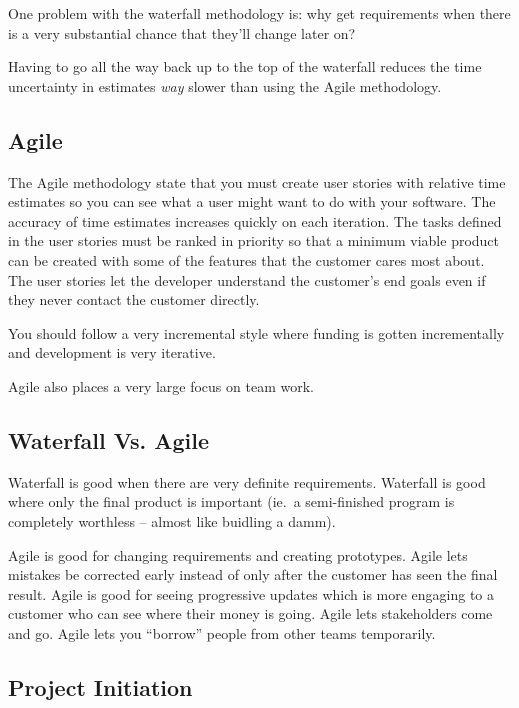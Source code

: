 One problem with the waterfall methodology is: why get requirements when there is a very substantial chance that they'll change later on?

Having to go all the way back up to the top of the waterfall reduces the time uncertainty in estimates \emph{way} slower than using the Agile methodology.

\subsection{Agile}\label{sub:agile}

The Agile methodology state that you must create user stories with relative time estimates so you can see what a user might want to do with your software.
The accuracy of time estimates increases quickly on each iteration.
The tasks defined in the user stories must be ranked in priority so that a minimum viable product can be created with some of the features that the customer cares most about.
The user stories let the developer understand the customer's end goals even if they never contact the customer directly.

You should follow a very incremental style where funding is gotten incrementally and development is very iterative.

Agile also places a very large focus on team work.

\subsection{Waterfall Vs. Agile}\label{sub:waterfall_vs_agile}

Waterfall is good when there are very definite requirements.
Waterfall is good where only the final product is important (ie.\ a semi-finished program is completely worthless -- almost like buidling a damm).

Agile is good for changing requirements and creating prototypes.
Agile lets mistakes be corrected early instead of only after the customer has seen the final result.
Agile is good for seeing progressive updates which is more engaging to a customer who can see where their money is going.
Agile lets stakeholders come and go.
Agile lets you ``borrow'' people from other teams temporarily.

\subsection{Project Initiation}\label{sub:project_initiation}


